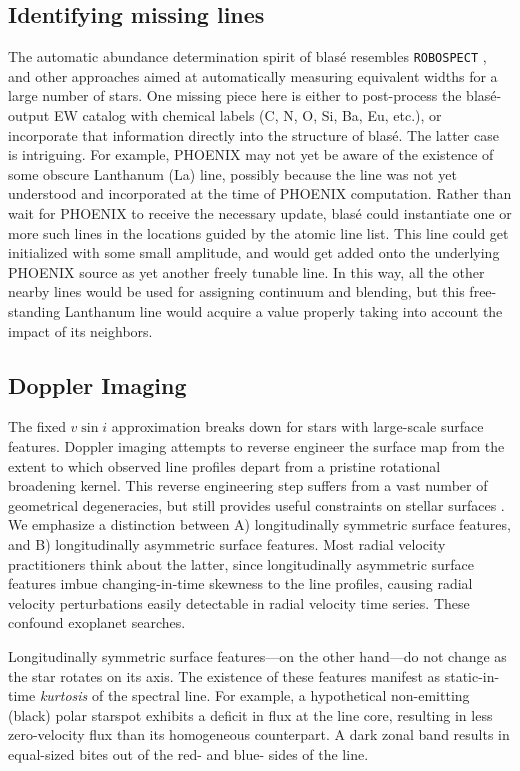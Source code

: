 \documentclass[twocolumn]{aastex631}
\begin{document}
\subsection{Identifying missing lines}\label{secMissingLines}
The automatic abundance determination spirit of blas\'e resembles \texttt{ROBOSPECT} \citep{2013PASP..125.1164W}, and other approaches aimed at automatically measuring equivalent widths for a large number of stars.  One missing piece here is either to post-process the blas\'e-output EW catalog with chemical labels (C, N, O, Si, Ba, Eu, etc.), or incorporate that information directly into the structure of blas\'e.  The latter case is intriguing.  For example, PHOENIX may not yet be aware of the existence of some obscure Lanthanum (La) line, possibly because the line was not yet understood and incorporated at the time of PHOENIX computation.  Rather than wait for PHOENIX to receive the necessary update, blas\'e could instantiate one or more such lines in the locations guided by the atomic line list.  This line could get initialized with some small amplitude, and would get added onto the underlying PHOENIX source as yet another freely tunable line.  In this way, all the other nearby lines would be used for assigning continuum and blending, but this free-standing Lanthanum line would acquire a value properly taking into account the impact of its neighbors.


\subsection{Doppler Imaging}
The fixed $v\sin{i}$ approximation breaks down for stars with large-scale surface features.  Doppler imaging attempts to reverse engineer the surface map from the extent to which observed line profiles depart from a pristine rotational broadening kernel.  This reverse engineering step suffers from a vast number of geometrical degeneracies, but still provides useful constraints on stellar surfaces \citep{2021arXiv211006271L}.  We emphasize a distinction between A) longitudinally symmetric surface features, and B) longitudinally asymmetric surface features.  Most radial velocity practitioners think about the latter, since longitudinally asymmetric surface features imbue changing-in-time skewness to the line profiles, causing radial velocity perturbations easily detectable in radial velocity time series.  These confound exoplanet searches.

Longitudinally symmetric surface features---on the other hand---do not change as the star rotates on its axis.  The existence of these features manifest as static-in-time \emph{kurtosis} of the spectral line.  For example, a hypothetical non-emitting (black) polar starspot exhibits a deficit in flux at the line core, resulting in less zero-velocity flux than its homogeneous counterpart.  A dark zonal band results in equal-sized bites out of the red- and blue- sides of the line.
\end{document}
